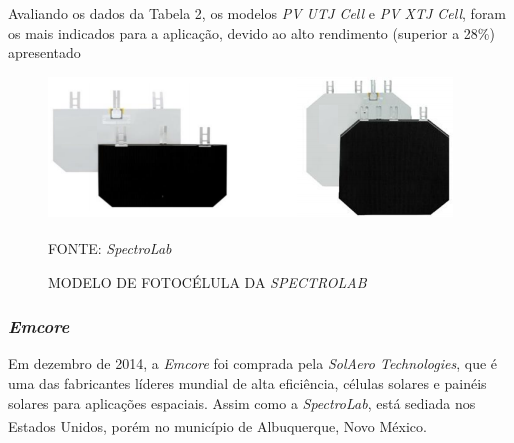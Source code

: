 \documentclass[
	12pt,				%
	openright,			%
	oneside,			%
	a4paper,			%
	english,			%
	french,				%
	spanish,			%
	brazil,				%
	oldfontcommands
	]{abntex2}
\begin{document}
	Avaliando os dados da Tabela 2, os modelos \textit{PV UTJ Cell} e \textit{PV XTJ Cell}, foram os mais indicados para a aplicação, devido ao alto rendimento (superior a 28\%) apresentado
	
	\begin{figure}[th]
		\caption{MODELO DE FOTOCÉLULA DA \textit{SPECTROLAB}}
		\centering
		\includegraphics[width=1.0\linewidth]{./figs/UTJ}
			
		\begin{small}
			FONTE: \textit{SpectroLab}\textsuperscript{\cite{SpectroLab2}}
		\end{small}		
	\end{figure}

\subsubsection[Emcore]{\textit{Emcore}}

	Em dezembro de 2014, a \textit{Emcore} foi comprada pela \textit{SolAero Technologies}, que é uma das fabricantes líderes mundial de alta eficiência, células solares e painéis solares para aplicações espaciais. Assim como a \textit{SpectroLab}, está sediada nos Estados Unidos, porém no município de Albuquerque, Novo México.\textsuperscript{\cite{Emcore}}\textsuperscript{\cite{Emcore2}}
	
\end{document}
